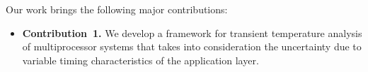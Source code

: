 Our work brings the following major contributions:
\begin{itemize}

  \item {\bfseries Contribution~1.} We develop a framework for transient
    temperature analysis of multiprocessor systems that takes into consideration
    the uncertainty due to variable timing characteristics of the application
    layer.

\end{itemize}
